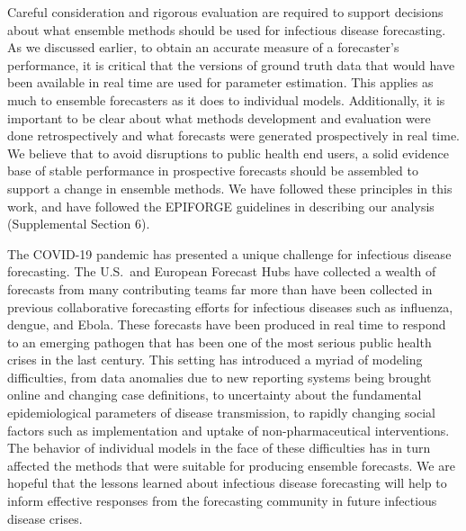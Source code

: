 \documentclass[11pt,3p,review,authoryear]{elsarticle}
\begin{document}
Careful consideration and rigorous evaluation are required to support decisions about what ensemble methods should be used for infectious disease forecasting. As we discussed earlier, to obtain an accurate measure of a forecaster's performance, it is critical that the versions of ground truth data that would have been available in real time are used for parameter estimation. This applies as much to ensemble forecasters as it does to individual models. Additionally, it is important to be clear about what methods development and evaluation were done retrospectively and what forecasts were generated prospectively in real time. We believe that to avoid disruptions to public health end users, a solid evidence base of stable performance in prospective forecasts should be assembled to support a change in ensemble methods. We have followed these principles in this work, and have followed the EPIFORGE guidelines in describing our analysis (Supplemental Section 6).

The COVID-19 pandemic has presented a unique challenge for infectious disease forecasting. The U.S.\ and European Forecast Hubs have collected a wealth of forecasts from many contributing teams \textemdash far more than have been collected in previous collaborative forecasting efforts for infectious diseases such as influenza, dengue, and Ebola. These forecasts have been produced in real time to respond to an emerging pathogen that has been one of the most serious public health crises in the last century. This setting has introduced a myriad of modeling difficulties, from data anomalies due to new reporting systems being brought online and changing case definitions, to uncertainty about the fundamental epidemiological parameters of disease transmission, to rapidly changing social factors such as implementation and uptake of non-pharmaceutical interventions. The behavior of individual models in the face of these difficulties has in turn affected the methods that were suitable for producing ensemble forecasts. We are hopeful that the lessons learned about infectious disease forecasting will help to inform effective responses from the forecasting community in future infectious disease crises.



\end{document}
